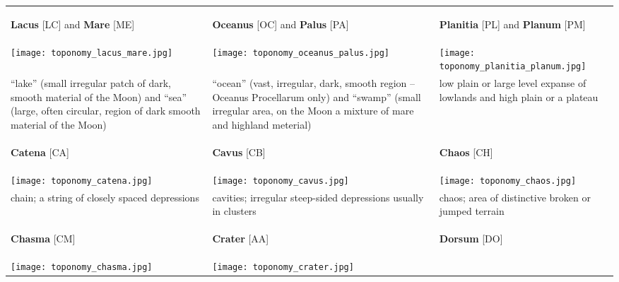 \begin{longtable}{p{45mm}|p{45mm}|p{45mm}}\toprule
\begin{center}\textbf{Lacus} [LC] and \textbf{Mare} [ME]\end{center} & \begin{center}\textbf{Oceanus} [OC] and \textbf{Palus} [PA]\end{center} & \begin{center}\textbf{Planitia} [PL] and \textbf{Planum} [PM]\end{center} \\
\texttt{[image: toponomy\_lacus\_mare.jpg]}  & \texttt{[image: toponomy\_oceanus\_palus.jpg]} & \texttt{[image: toponomy\_planitia\_planum.jpg]} \\
``lake'' (small irregular patch of dark, smooth material of the Moon) and ``sea'' (large, often circular, region of dark smooth material of the Moon) & ``ocean'' (vast, irregular, dark, smooth region -- Oceanus Procellarum only) and ``swamp'' (small irregular area, on the Moon a mixture of mare and highland meterial) & low plain or large level expanse of lowlands and high plain or a plateau \\\midrule
\begin{center}\textbf{Catena} [CA]\end{center} & \begin{center}\textbf{Cavus} [CB]\end{center} & \begin{center}\textbf{Chaos} [CH]\end{center} \\
\texttt{[image: toponomy\_catena.jpg]} & 
\texttt{[image: toponomy\_cavus.jpg]} & 
\texttt{[image: toponomy\_chaos.jpg]} \\
chain; a string of closely spaced depressions & cavities; irregular steep-sided depressions usually in clusters & chaos; area of distinctive broken or jumped terrain \\\midrule
\begin{center}\textbf{Chasma} [CM]\end{center} & \begin{center}\textbf{Crater} [AA]\end{center} & \begin{center}\textbf{Dorsum} [DO]\end{center} \\
\texttt{[image: toponomy\_chasma.jpg]} & 
\texttt{[image: toponomy\_crater.jpg]} & 

\end{longtable}
